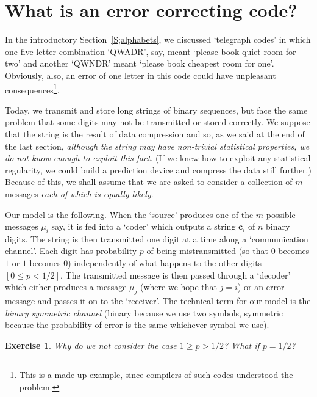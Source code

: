 \documentclass[12pt,a4paper]{article}
\theoremstyle{plain}
\newtheorem{exercise}[theorem]{Exercise}
\theoremstyle{definition}
\begin{document}
\section{What is an error correcting code?}
In the introductory Section~\ref{S;alphabets}, 
we discussed `telegraph codes' in which
one five letter
combination `QWADR', say, meant `please book
quiet room for two' and another `QWNDR' meant
`please book cheapest room for one'.
Obviously, also, an error of one letter
in this code could have unpleasant
consequences\footnote{This is a made up example,
since compilers of such codes understood the problem.}.

Today, we transmit and store long strings of 
binary sequences, but face the same problem
that some digits may not be transmitted or stored correctly.
We suppose that the string is the result of data compression
and so, as we said at the end of the last
section, \emph{although the string 
may have non-trivial
statistical properties, 
we do not know
enough to exploit this fact}. (If we knew how to
exploit any statistical regularity, we could build a
prediction device and compress the data still further.)
Because of this, we shall assume that
we are asked to consider a collection
of $m$ messages \emph{each of which is equally
likely}.

Our model is the following. When the `source'
produces one of the $m$ possible messages $\mu_{i}$ say,
it is fed into a `coder' which outputs
a string $\mathbf{c}_{i}$ of $n$ binary digits.
The string is then transmitted one digit
at a time along a `communication channel'.
Each digit has probability $p$ of being mistransmitted
(so that $0$ becomes $1$ or $1$ becomes $0$)
independently of what happens to the other digits $[0\leq p<1/2]$.
The transmitted message is then passed through
a `decoder' which either produces a message $\mu_{j}$
(where we hope that $j=i$) or an error message
and passes it on to the `receiver'.
The technical term for our model is the
\emph{binary symmetric channel} (binary because
we use two symbols, symmetric because
the probability of error is the same whichever 
symbol we use).
\begin{exercise}\label{Reverse} Why do we not consider
the case $1\geq p>1/2$? What
if $p=1/2$?
\end{exercise}
\end{document}
